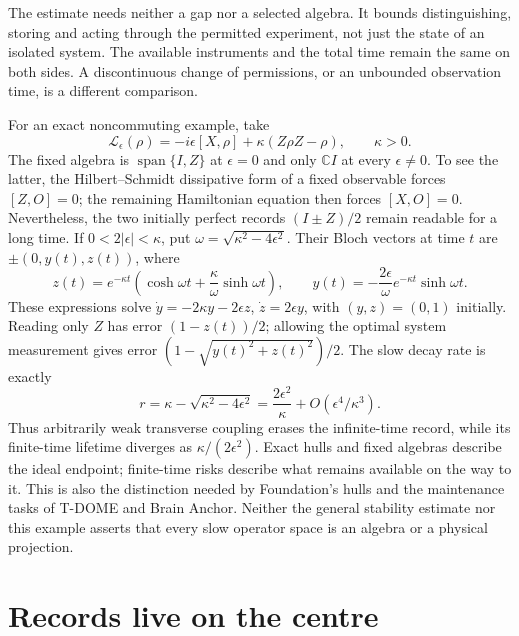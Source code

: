 \documentclass[12pt,a4paper]{article}
\begin{document}
The estimate needs neither a gap nor a selected algebra. It bounds
distinguishing, storing and acting through the permitted experiment,
not just the state of an isolated system. The available instruments
and the total time remain the same on both sides. A discontinuous
change of permissions, or an unbounded observation time, is a different
comparison.

For an exact noncommuting example, take
\begin{equation}\label{eq:transverse-qubit}
 \mathcal L_\epsilon(\rho)=-i\epsilon[X,\rho]
 +\kappa(Z\rho Z-\rho),\qquad \kappa>0.
\end{equation}
The fixed algebra is $\operatorname{span}\{I,Z\}$ at $\epsilon=0$ and
only $\mathbb CI$ at every $\epsilon\ne0$. To see the latter, the
Hilbert--Schmidt dissipative form of a fixed observable forces
$[Z,O]=0$; the remaining Hamiltonian equation then forces $[X,O]=0$.
Nevertheless, the two initially perfect records $(I\pm Z)/2$ remain
readable for a long time. If $0<2|\epsilon|<\kappa$, put
$\omega=\sqrt{\kappa^2-4\epsilon^2}$. Their Bloch vectors at time $t$
are $\pm(0,y(t),z(t))$, where
\begin{equation}\label{eq:transverse-record}
 z(t)=e^{-\kappa t}\left(\cosh\omega t+
       \frac{\kappa}{\omega}\sinh\omega t\right),\qquad
 y(t)=-\frac{2\epsilon}{\omega}e^{-\kappa t}\sinh\omega t.
\end{equation}
These expressions solve $\dot y=-2\kappa y-2\epsilon z$,
$\dot z=2\epsilon y$, with $(y,z)=(0,1)$ initially. Reading only $Z$
has error $(1-z(t))/2$; allowing the optimal system measurement gives
error $(1-\sqrt{y(t)^2+z(t)^2})/2$. The slow decay rate is exactly
\begin{equation}\label{eq:transverse-rate}
 r=\kappa-\sqrt{\kappa^2-4\epsilon^2}
   =\frac{2\epsilon^2}{\kappa}+O(\epsilon^4/\kappa^3).
\end{equation}
Thus arbitrarily weak transverse coupling erases the infinite-time
record, while its finite-time lifetime diverges as
$\kappa/(2\epsilon^2)$. Exact hulls and fixed algebras describe the
ideal endpoint; finite-time risks describe what remains available on
the way to it. This is also the distinction needed by Foundation's
hulls and the maintenance tasks of T-DOME and Brain Anchor. Neither
the general stability estimate nor this example asserts that every
slow operator space is an algebra or a physical projection.

\section{Records live on the centre}
\label{sec:records}
\end{document}
